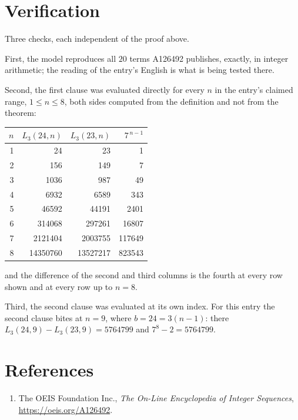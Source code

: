\documentclass[11pt,a4paper]{article}
\theoremstyle{plain}
\theoremstyle{definition}
\begin{document}
\section{Verification}

Three checks, each independent of the proof above.

First, the model reproduces all $20$ terms A126492 publishes, exactly, in integer
arithmetic; the reading of the entry's English is what is being tested there.

Second, the first clause was evaluated directly for every $n$ in the entry's claimed range,
$1\le n\le8$, both sides computed from the definition and not from the theorem:

\begin{center}
\begin{tabular}{rrrr}
$n$ & $L_{3}(24,n)$ & $L_{3}(23,n)$ & $7^{\,n-1}$ \\ \hline
1 & 24 & 23 & 1 \\
2 & 156 & 149 & 7 \\
3 & 1036 & 987 & 49 \\
4 & 6932 & 6589 & 343 \\
5 & 46592 & 44191 & 2401 \\
6 & 314068 & 297261 & 16807 \\
7 & 2121404 & 2003755 & 117649 \\
8 & 14350760 & 13527217 & 823543 \\
\end{tabular}
\end{center}

\noindent and the difference of the second and third columns is the fourth at every row shown
and at every row up to $n=8$.

Third, the second clause was evaluated at its own index. For this entry the second clause bites at $n=9$, where $b=24=3(n-1)$: there $L_{3}(24,9)-L_{3}(23,9)=5764799$ and $7^{8}-2=5764799$.

\section*{References}
\begin{enumerate}
\item The OEIS Foundation Inc., \emph{The On-Line Encyclopedia of Integer Sequences},
\url{https://oeis.org/A126492}.
\end{enumerate}
\end{document}
